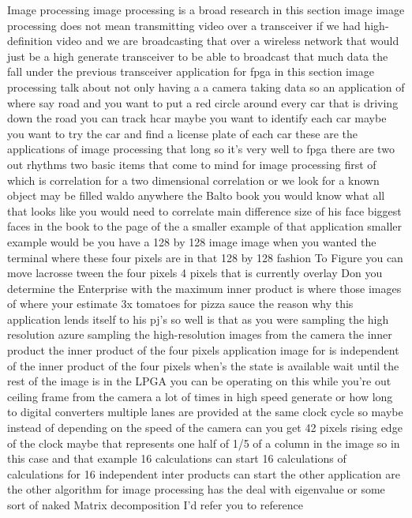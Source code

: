 Image processing image processing is a broad research in this section image image processing does not mean transmitting video over a transceiver if we had high-definition video and we are broadcasting that over a wireless network that would just be a high generate transceiver to be able to broadcast that much data the fall under the previous transceiver application for fpga in this section image processing talk about not only having a a camera taking data so an application of where say road and you want to put a red circle around every car that is driving down the road you can track hcar maybe you want to identify each car maybe you want to try the car and find a license plate of each car these are the applications of image processing that long so it's very well to fpga there are two out rhythms two basic items that come to mind for image processing first of which is correlation for a two dimensional correlation or we look for a known object may be filled waldo anywhere the Balto book you would know what all that looks like you would need to correlate main difference size of his face biggest faces in the book to the page of the a smaller example of that application smaller example would be you have a 128 by 128 image image when you wanted the terminal where these four pixels are in that 128 by 128 fashion To Figure you can move lacrosse tween the four pixels 4 pixels that is currently overlay Don you determine the Enterprise with the maximum inner product is where those images of where your estimate 3x tomatoes for pizza sauce the reason why this application lends itself to his pj's so well is that as you were sampling the high resolution azure sampling the high-resolution images from the camera the inner product the inner product of the four pixels application image for is independent of the inner product of the four pixels when's the state is available wait until the rest of the image is in the LPGA you can be operating on this while you're out ceiling frame from the camera a lot of times in high speed generate or how long to digital converters multiple lanes are provided at the same clock cycle so maybe instead of depending on the speed of the camera can you get 42 pixels rising edge of the clock maybe that represents one half of 1/5 of a column in the image so in this case and that example 16 calculations can start 16 calculations of calculations for 16 independent inter products can start the other application are the other algorithm for image processing has the deal with eigenvalue or some sort of naked Matrix decomposition I'd refer you to reference

